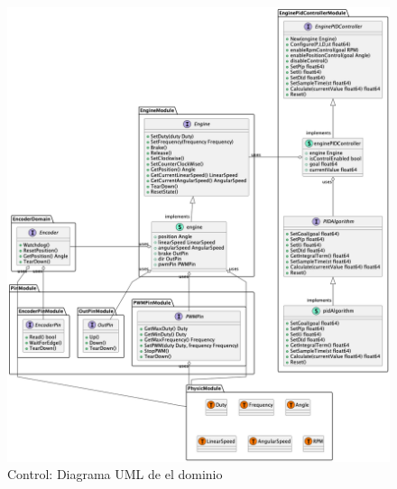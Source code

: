 \begin{figure}[H]
    \centering
    \includegraphics[height=0.45\textheight]{./part/Proyecto_ejecutivo/memoria_descriptiva/descripcionDelProyecto/control/uml/controlDomain}
    \caption{Control: Diagrama UML de el dominio}\label{fig:Control-Diagrama UML de el dominio}
\end{figure}

